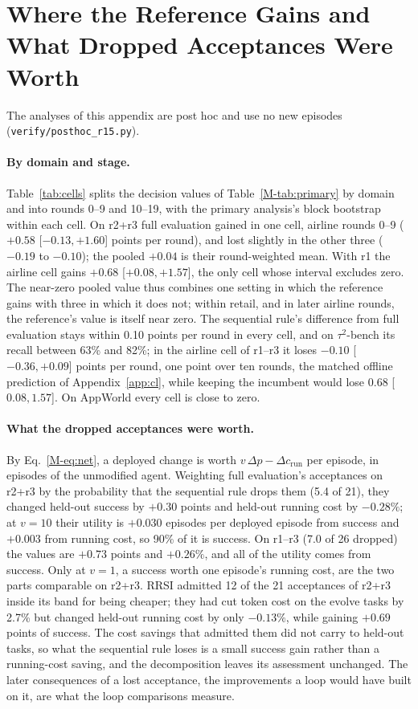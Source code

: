 \documentclass[11pt]{article}
\begin{document}
\section{Where the Reference Gains and What Dropped Acceptances Were Worth}
\label{app:r15}

The analyses of this appendix are post hoc and use no new episodes (\texttt{verify/posthoc\_r15.py}).

\paragraph{By domain and stage.} Table~\ref{tab:cells} splits the decision values of Table~\ref*{M-tab:primary} by domain and into rounds 0--9 and 10--19, with the primary analysis's block bootstrap within each cell. On r2+r3 full evaluation gained in one cell, airline rounds 0--9 ($+0.58$ [$-0.13,+1.60$] points per round), and lost slightly in the other three ($-0.19$ to $-0.10$); the pooled $+0.04$ is their round-weighted mean. With r1 the airline cell gains $+0.68$ [$+0.08,+1.57$], the only cell whose interval excludes zero. The near-zero pooled value thus combines one setting in which the reference gains with three in which it does not; within retail, and in later airline rounds, the reference's value is itself near zero. The sequential rule's difference from full evaluation stays within 0.10 points per round in every cell, and on $\tau^2$-bench its recall between 63\% and 82\%; in the airline cell of r1--r3 it loses $-0.10$ [$-0.36,+0.09$] points per round, one point over ten rounds, the matched offline prediction of Appendix~\ref{app:cl}, while keeping the incumbent would lose $0.68$ [$0.08,1.57$]. On AppWorld every cell is close to zero.

\paragraph{What the dropped acceptances were worth.} By Eq.~\ref*{M-eq:net}, a deployed change is worth $v\,\Delta p-\Delta c_{\mathrm{run}}$ per episode, in episodes of the unmodified agent. Weighting full evaluation's acceptances on r2+r3 by the probability that the sequential rule drops them (5.4 of 21), they changed held-out success by $+0.30$ points and held-out running cost by $-0.28\%$; at $v=10$ their utility is $+0.030$ episodes per deployed episode from success and $+0.003$ from running cost, so 90\% of it is success. On r1--r3 (7.0 of 26 dropped) the values are $+0.73$ points and $+0.26\%$, and all of the utility comes from success. Only at $v=1$, a success worth one episode's running cost, are the two parts comparable on r2+r3. RRSI admitted 12 of the 21 acceptances of r2+r3 inside its band for being cheaper; they had cut token cost on the evolve tasks by 2.7\% but changed held-out running cost by only $-0.13\%$, while gaining $+0.69$ points of success. The cost savings that admitted them did not carry to held-out tasks, so what the sequential rule loses is a small success gain rather than a running-cost saving, and the decomposition leaves its assessment unchanged. The later consequences of a lost acceptance, the improvements a loop would have built on it, are what the loop comparisons measure.
\end{document}
